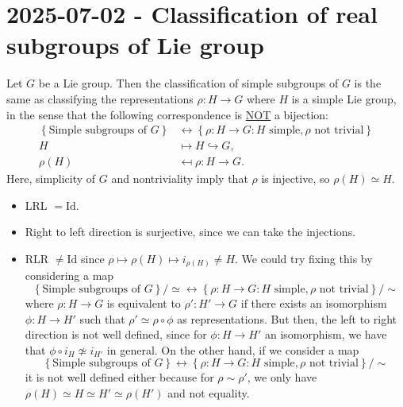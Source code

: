 \documentclass{report}
\begin{document}
\section{2025-07-02 - Classification of real subgroups of Lie group}
Let $G$ be a Lie group.
Then the classification of simple subgroups of $G$ is the same as classifying the representations $\rho:H \to G$ where $H$ is a simple Lie group, in the sense that the following correspondence is \underline{NOT} a bijection:
\begin{align*}
\left\{ \text{Simple subgroups of } G \right\} &\leftrightarrow \left\{ \rho: H \to G : H \text{ simple}, \rho \text{ not trivial} \right\} \\
H &\mapsto H \hookrightarrow G, \\
\rho(H) &\mapsfrom \rho: H \to G.
\end{align*}
Here, simplicity of $G$ and nontriviality imply that $\rho$ is injective, so $\rho(H) \simeq H$.
\begin{itemize}
    \item LRL $= \mathrm{Id}$.
    \item Right to left direction is surjective, since we can take the injections.
    \item RLR $ \neq \mathrm{Id}$ since $\rho \mapsto \rho(H) \mapsto i_{\rho(H)} \neq H$. We could try fixing this by considering a map 
    \[
    \left\{ \text{Simple subgroups of } G \right\}/\simeq \leftrightarrow \left\{ \rho: H \to G : H \text{ simple}, \rho \text{ not trivial} \right\} / \sim
    \]
    where $\rho: H \to G$ is equivalent to $\rho': H' \to G$ if there exists an isomorphism $\phi: H \to H'$ such that $\rho' \simeq \rho \circ \phi$ as representations.
    But then, the left to right direction is not well defined, since for $\phi: H \to H'$ an isomorphism, we have that $\phi \circ i_H \not \simeq i_{H'}$ in general.
    On the other hand, if we consider a map 
    \[
    \left\{ \text{Simple subgroups of } G \right\} \leftrightarrow \left\{ \rho: H \to G : H \text{ simple}, \rho \text{ not trivial} \right\} / \sim
    \]
    it is not well defined either because for $\rho \sim \rho'$, we only have $\rho(H) \simeq H \simeq H' \simeq \rho(H')$ and not equality.
\end{itemize}
\end{document}
